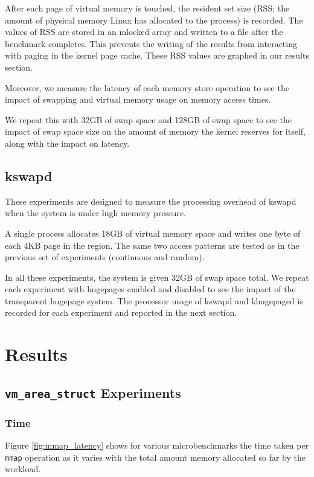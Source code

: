 \documentclass[twocolumn,11pt]{article}
\begin{document}
After each page of virtual memory is touched, the resident set size (RSS; the
amount of physical memory Linux has allocated to the process) is recorded.  The
values of RSS are stored in an mlocked array and written to a file after the
benchmark completes. This prevents the writing of the results from interacting
with paging in the kernel page cache. These RSS values are graphed in our
results section.

Moreover, we measure the latency of each memory store operation to see the
impact of swapping and virtual memory usage on memory access times.

We repeat this with 32GB of swap space and 128GB of swap space to see the
impact of swap space size on the amount of memory the kernel reserves for
itself, along with the impact on latency.

\subsection{kswapd}

These experiments are designed to measure the processing overhead of kswapd when
the system is under high memory pressure.

A single process allocates 18GB of virtual memory space and writes one byte of
each 4KB page in the region. The same two access patterns are tested as in the
previous set of experiments (continuous and random).

In all these experiments, the system is given 32GB of swap space total. We
repeat each experiment with hugepages enabled and disabled to see the impact of
the transparent hugepage system. The processor usage of kswapd and khugepaged is
recorded for each experiment and reported in the next section.

\section{Results}

\subsection{\texttt{vm\_area\_struct} Experiments}

\subsubsection{Time}

Figure \ref{fig:mmap_latency} shows for various microbenchmarks the time taken
per \texttt{mmap} operation as it varies with the total amount memory allocated
so far by the workload. 
\end{document}
